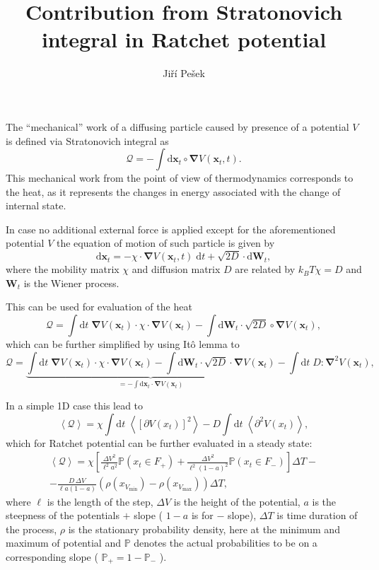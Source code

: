 \documentclass[11pt]{article}
\newcommand{\rmd}{{\mathrm d}}
\renewcommand{\vec}[1]{{\boldsymbol {#1}}}
\begin{document}
\title{Contribution from Stratonovich integral in Ratchet potential}
\author{Jiří Pešek}
\maketitle

The ``mechanical'' work of a diffusing particle caused by presence of a potential $V$ is defined via Stratonovich integral as  
\[
{\mathcal Q} = - \int \rmd \vec{x}_t \circ \vec{\nabla} V(\vec{x}_t,t) .
\]
This mechanical work from the point of view of thermodynamics corresponds to the heat, as it represents the changes in energy associated with the change of internal state. 

In case no additional external force is applied except for the aforementioned potential $V$ the equation of motion of such particle is given by
\[
\rmd \vec{x}_t = - \chi \cdot \vec{\nabla} V( \vec{x}_t, t ) \; \rmd t + \sqrt{2 D} \cdot \rmd \vec{W}_t , 
\]
where the mobility matrix $\chi$ and diffusion matrix $D$ are related by $ k_B T \chi = D$ and $\vec{W}_t$ is the Wiener process. 

This can be used for evaluation of the heat 
\[
{\mathcal Q} = \int \rmd t \; \vec{\nabla} V (\vec{x}_t) \cdot \chi \cdot \vec{\nabla} V(\vec{x}_t) - \int \rmd \vec{W}_t \cdot \sqrt{2 D} \circ \vec{\nabla} V(\vec{x}_t) ,
\]
which can be further simplified by using It\^{o} lemma to 
\begin{equation}
{\mathcal Q} = \underbrace{\int \rmd t \; \vec{\nabla} V (\vec{x}_t) \cdot \chi \cdot \vec{\nabla} V(\vec{x}_t) 
- \int \rmd \vec{W}_t \cdot \sqrt{2 D} \cdot \vec{\nabla} V(\vec{x}_t) }_{ = - \int \rmd \vec{x}_t \cdot \vec{\nabla} V(\vec{x}_t) }
- \int \rmd t \; D : \vec{\nabla}^2 V(\vec{x}_t) ,
\label{equ:heat}
\end{equation}

In a simple 1D case this lead to 
\[
\left\langle {\mathcal Q} \right\rangle = \chi \int \rmd t \; \left\langle \left[ \partial V(x_t) \right]^2 \right\rangle
- D \int \rmd t \; \left\langle \partial^2 V(x_t) \right\rangle ,
\]
which for Ratchet potential can be further evaluated in a steady state:
\begin{multline}
\left\langle {\mathcal Q} \right\rangle = \chi \left[ \frac{ \Delta V^2 }{ \ell^2 a^2 } {\mathbb P}( x_t \in F_+ ) + \frac{ \Delta V^2 }{ \ell^2 (1-a)^2 } {\mathbb P}(x_t \in F_- ) \right] \Delta T 
- \\
- \frac{ D \, \Delta V }{\ell a (1-a) } \left( \rho(x_{V_\text{min}}) - \rho(x_{V_\text{max}}) \right) \Delta T,
\label{equ:mean_heat}
\end{multline}
where $\ell$ is the length of the step, $\Delta V$ is the height of the potential,  $a$ is the steepness of the potentials $+$ slope ( $1-a$ is for $-$ slope), $\Delta T$ is time duration of the process, $\rho$ is the stationary probability density, here at the minimum and maximum of potential and $\mathbb P$ denotes the actual probabilities to be on a corresponding slope ( ${\mathbb P}_+ = 1 - {\mathbb P}_-$ ).
\end{document}
